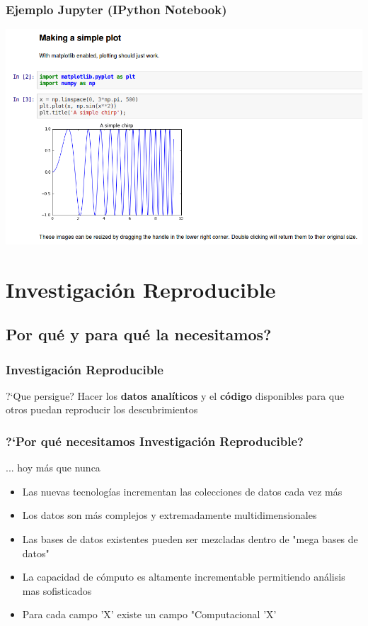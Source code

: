 \documentclass[sans serif,9pt,xcolor=dvipsnames]{beamer}%
\begin{document}
\begin{frame}
\frametitle{Ejemplo Jupyter (IPython Notebook)}
\includegraphics[scale=0.3]{imagenes/pynb.png} 
\end{frame}


\section{Investigación Reproducible}
\subsection{Por qué y para qué la necesitamos?}
\begin{frame}
\frametitle {Investigación Reproducible}
\justifying
\begin{block}{?`Que persigue?}
\LARGE Hacer los \textbf{datos analíticos} y el \textbf{código} disponibles para que otros puedan reproducir los descubrimientos
\end{block}
\end{frame}


\begin{frame}
\frametitle{?`Por qué necesitamos Investigación Reproducible?}
\begin{block}{... hoy más que nunca}
\begin{itemize}
\justifying
\item Las nuevas tecnologías incrementan las colecciones de datos cada vez más
\item Los datos son más complejos y extremadamente multidimensionales
\item Las bases de datos existentes pueden ser mezcladas dentro de "mega bases de datos"
\item La capacidad de cómputo es altamente incrementable permitiendo análisis mas sofisticados
\item Para cada campo 'X' existe un campo "Computacional 'X'

\end{itemize}
\end{block}
\end{frame}
\end{document}
